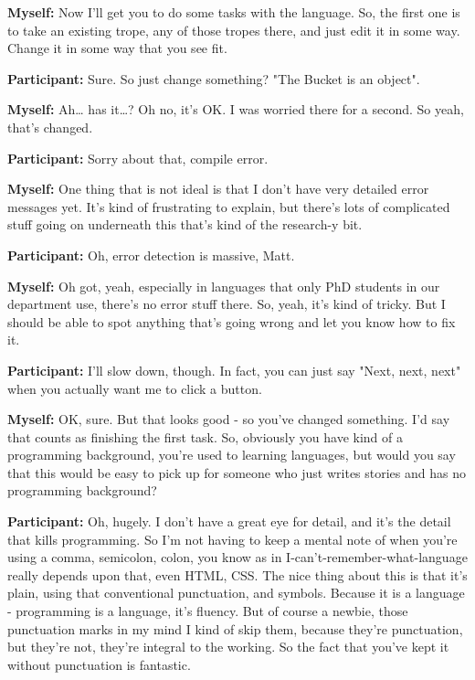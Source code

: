 \documentclass[11pt]{report}
\newcommand{\llabel}[1]{\hypertarget{llineno:#1}{\linelabel{#1}}}
\begin{document}
\begin{linenumbers}
\textbf{Myself:} Now I'll get you to do some tasks with the language. So, the first one is to take an existing trope, any of those tropes there, and just edit it in some way. Change it in some way that you see fit.

\textbf{Participant:} Sure. So just change something? "The Bucket is an object".

\textbf{Myself:} Ah\ldots{} has it\ldots{}? Oh no, it's OK. I was worried there for a second. So yeah, that's changed.

\textbf{Participant:} Sorry about that, compile error.

\textbf{Myself:} One thing that is not ideal is that I don't have very detailed
error messages yet. It's kind of frustrating to explain, but there's lots of
complicated stuff going on underneath this that's kind of the research-y
bit.\llabel{lne:bug4b}

\textbf{Participant:} Oh, error detection is massive, Matt.

\textbf{Myself:} Oh got, yeah, especially in languages that only PhD students in our department use, there's no error stuff there. So, yeah, it's kind of tricky. But I should be able to spot anything that's going wrong and let you know how to fix it.

\textbf{Participant:} I'll slow down, though. In fact, you can just say "Next, next, next" when you actually want me to click a button.

\textbf{Myself:} OK, sure. But that looks good - so you've changed something. I'd say that counts as finishing the first task. So, obviously you have kind of a programming background, you're used to learning languages, but would you say that this would be easy to pick up for someone who just writes stories and has no programming background?

\textbf{Participant:} Oh, hugely. I don't have a great eye for detail, and it's
the detail that kills programming. So I'm not having to keep a mental note of
when you're using a comma, semicolon, colon, you know as in
I-can't-remember-what-language really depends upon that, even HTML, CSS. The
nice thing about this is that it's plain, using that conventional punctuation,
and symbols. Because it is a language - programming is a language, it's fluency.
But of course a newbie, those punctuation marks in my mind I kind of skip them,
because they're punctuation, but they're not, they're integral to the working.
So the fact that you've kept it without punctuation is fantastic.\llabel{lne:use1b}


\end{linenumbers}
\end{document}
